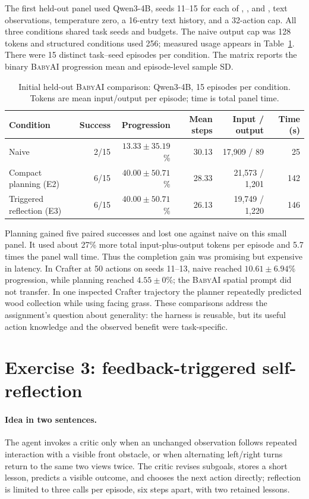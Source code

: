\documentclass[11pt,a4paper]{article}
\newcommand{\BabyAI}{\textsc{BabyAI}}
\begin{document}
The first held-out panel used Qwen3-4B, seeds 11--15 for each of , , and , text observations, temperature zero, a 16-entry text history, and a 32-action cap. All three conditions shared task seeds and budgets. The naive output cap was 128 tokens and structured conditions used 256; measured usage appears in Table~\ref{tab:initial}. There were 15 distinct task--seed episodes per condition. The matrix reports the binary \BabyAI{} progression mean and episode-level sample SD.

\begin{table}[htbp]
\centering
\caption{Initial held-out \BabyAI{} comparison: Qwen3-4B, 15 episodes per condition. Tokens are mean input/output per episode; time is total panel time.}
\label{tab:initial}
\small
\begin{tabular}{@{}lrrrrr@{}}
\toprule
Condition & Success & Progression & Mean steps & Input / output & Time (s) \\
\midrule
Naive & 2/15 & $13.33\pm35.19$\% & 30.13 & 17,909 / 89 & 25 \\
Compact planning (E2) & 6/15 & $40.00\pm50.71$\% & 28.33 & 21,573 / 1,201 & 142 \\
Triggered reflection (E3) & 6/15 & $40.00\pm50.71$\% & 26.13 & 19,749 / 1,220 & 146 \\
\bottomrule
\end{tabular}
\end{table}

Planning gained five paired successes and lost one against naive on this small panel. It used about 27\% more total input-plus-output tokens per episode and 5.7 times the panel wall time. Thus the completion gain was promising but expensive in latency. In Crafter at 50 actions on seeds 11--13, naive reached $10.61\pm6.94$\% progression, while planning reached $4.55\pm0$\%; the \BabyAI{} spatial prompt did not transfer. In one inspected Crafter trajectory the planner repeatedly predicted wood collection while using  facing grass. These comparisons address the assignment's question about generality: the harness is reusable, but its useful action knowledge and the observed benefit were task-specific.

\section{Exercise 3: feedback-triggered self-reflection}

\paragraph{Idea in two sentences.} The agent invokes a critic only when an unchanged observation follows repeated interaction with a visible front obstacle, or when alternating left/right turns return to the same two views twice. The critic revises subgoals, stores a short lesson, predicts a visible outcome, and chooses the next action directly; reflection is limited to three calls per episode, six steps apart, with two retained lessons.
\end{document}
